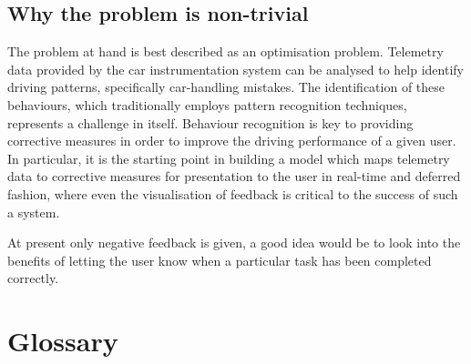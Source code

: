 \documentclass{article}
\begin{document}
\subsection{Why the problem is non-trivial}
The problem at hand is best described as an optimisation problem. Telemetry data provided by the car instrumentation system can be analysed to help identify driving patterns, specifically car-handling mistakes. The identification of these behaviours, which traditionally employs pattern recognition techniques, represents a challenge in itself. Behaviour recognition is key to providing corrective measures in order to improve the driving performance of a given user. In particular, it is the starting point in building a model which maps telemetry data to corrective measures for presentation to the user in real-time and deferred fashion, where even the visualisation of feedback is critical to the success of such a system.

\newpage


\newpage


\newpage


\newpage


\newpage


\newpage


At present only negative feedback is given, a good idea would be to look into the benefits of letting the user know when a particular task has been completed correctly.

\newpage


\newpage
\section{Glossary}

\newpage



\newpage
{}

\end{document}
